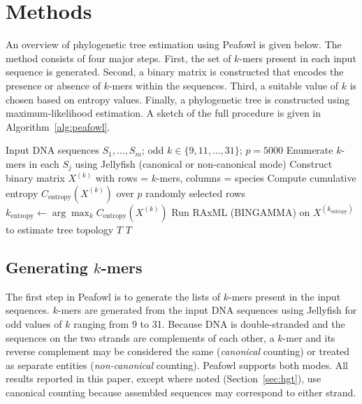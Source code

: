 \documentclass[11pt]{article}
\begin{document}
\section{Methods}

An overview of phylogenetic tree estimation using Peafowl is given below. The method consists of four major steps. First, the set of $k$-mers present in each input sequence is generated. Second, a binary matrix is constructed that encodes the presence or absence of $k$-mers within the sequences. Third, a suitable value of $k$ is chosen based on entropy values. Finally, a phylogenetic tree is constructed using maximum-likelihood estimation. A sketch of the full procedure is given in Algorithm~\ref{alg:peafowl}.

\begin{algorithm}[t]
\caption{Phylogeny estimation using Peafowl}
\label{alg:peafowl}
\begin{algorithmic}[1]
\Require Input DNA sequences $S_1,\dots,S_m$; odd $k\in\{9,11,\dots,31\}$; $p=5000$
  \State Enumerate $k$-mers in each $S_j$ using Jellyfish (canonical or non-canonical mode)
  \State Construct binary matrix $X^{(k)}$ with rows = $k$-mers, columns = species
  \State Compute cumulative entropy $C_{\text{entropy}}(X^{(k)})$ over $p$ randomly selected rows
\EndFor
\State $k_{\text{entropy}} \gets \arg\max_k C_{\text{entropy}}(X^{(k)})$
\State Run RAxML (BINGAMMA) on $X^{(k_{\text{entropy}})}$ to estimate tree topology $T$
\State \Return $T$
\end{algorithmic}
\end{algorithm}

\subsection{Generating $k$-mers}

The first step in Peafowl is to generate the lists of $k$-mers present in the input sequences. $k$-mers are generated from the input DNA sequences using Jellyfish \cite{marcais2011jellyfish} for odd values of $k$ ranging from 9 to 31. Because DNA is double-stranded and the sequences on the two strands are complements of each other, a $k$-mer and its reverse complement may be considered the same (\emph{canonical} counting) or treated as separate entities (\emph{non-canonical} counting). Peafowl supports both modes. All results reported in this paper, except where noted (Section~\ref{sec:hgt}), use canonical counting because assembled sequences may correspond to either strand.
\end{document}
